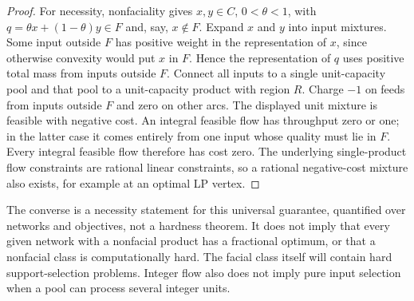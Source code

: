 \begin{proof}
For necessity, nonfaciality gives $x,y\in C$, $0<\theta<1$, with
$q=\theta x+(1-\theta)y\in F$ and, say, $x\notin F$. Expand $x$ and
$y$ into input mixtures. Some input outside $F$ has positive weight
in the representation of $x$, since otherwise convexity would put $x$
in $F$. Hence the representation of $q$ uses positive total mass from
inputs outside $F$. Connect all inputs to a single unit-capacity pool
and that pool to a unit-capacity product with region $R$. Charge $-1$
on feeds from inputs outside $F$ and zero on other arcs. The displayed
unit mixture is feasible with negative cost. An integral feasible flow
has throughput zero or one; in the latter case it comes entirely from
one input whose quality must lie in $F$. Every integral feasible flow
therefore has cost zero. The underlying single-product flow constraints
are rational linear constraints, so a rational negative-cost mixture
also exists, for example at an optimal LP vertex.
\end{proof}

The converse is a necessity statement for this universal guarantee,
quantified over networks and objectives, not a hardness theorem. It does
not imply that every given network with a nonfacial product has a
fractional optimum, or that a nonfacial class is computationally hard. The facial
class itself will contain hard support-selection problems. Integer flow
also does not imply pure input selection when a pool can process several
integer units.

